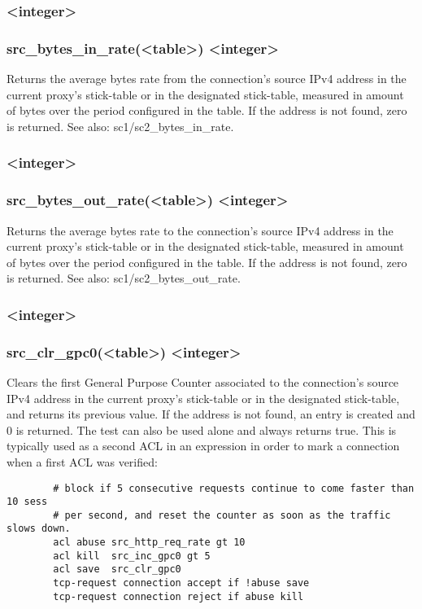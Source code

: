 \subsubsection[src\_bytes\_in\_rate]{ <integer>}
\subsubsection*{src\_bytes\_in\_rate(<table>) <integer>}
  Returns the average bytes rate from the connection's source IPv4 address in
  the current proxy's stick-table or in the designated stick-table, measured in
  amount of bytes over the period configured in the table. If the address is
  not found, zero is returned.
See also: sc1/sc2\_bytes\_in\_rate.

\subsubsection[src\_bytes\_out\_rate]{ <integer>}
\subsubsection*{src\_bytes\_out\_rate(<table>) <integer>}
  Returns the average bytes rate to the connection's source IPv4 address in the
  current proxy's stick-table or in the designated stick-table, measured in
  amount of bytes over the period configured in the table. If the address is
  not found, zero is returned.
See also: sc1/sc2\_bytes\_out\_rate.

\subsubsection[src\_clr\_gpc0]{ <integer>}
\subsubsection*{src\_clr\_gpc0(<table>) <integer>}
  Clears the first General Purpose Counter associated to the connection's
  source IPv4 address in the current proxy's stick-table or in the designated
  stick-table, and returns its previous value. If the address is not found, an
  entry is created and 0 is returned. The test can also be used alone and
  always returns true. This is typically used as a second ACL in an expression
  in order to mark a connection when a first ACL was verified:

\begin{verbatim}
        # block if 5 consecutive requests continue to come faster than 10 sess
        # per second, and reset the counter as soon as the traffic slows down.
        acl abuse src_http_req_rate gt 10
        acl kill  src_inc_gpc0 gt 5
        acl save  src_clr_gpc0
        tcp-request connection accept if !abuse save
        tcp-request connection reject if abuse kill
\end{verbatim}

